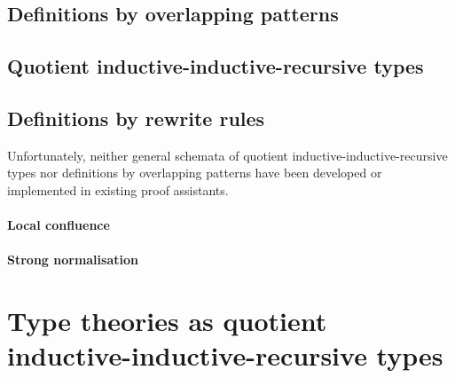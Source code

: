 \documentclass[a4paper,UKenglish,numberwithinsect,cleveref,thm-restate]{lipics-v2021}
\begin{document}
\subsection{Definitions by overlapping patterns}
\cite{Cockx2014,Altenkirch2016a}
\subsection{Quotient inductive-inductive-recursive types}
\subsection{Definitions by rewrite rules}
\cite{Cockx2020,Cockx2021}

Unfortunately, neither general schemata of quotient inductive-inductive-recursive types nor definitions by overlapping patterns have been developed or implemented in existing proof assistants.

\paragraph*{Local confluence}
\paragraph*{Strong normalisation}


\section{Type theories as quotient inductive-inductive-recursive types} \label{sec:QIIRTs}
\end{document}
